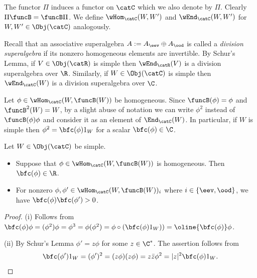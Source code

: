 \documentclass[12pt]{amsart}
\begin{document}
The functor $\Pi$ induces a functor on $\catC$ which  we also denote by $\Pi$.  Clearly $\Pi\funcB=\funcB\Pi$.
 We  define $\wHom_\catC(W,W')$ and $\wEnd_\catC(W,W')$ for $W,W'\in\Obj(\catC)$ analogously. 
 
Recall that an associative superalgebra $A:=A_{\eev}\oplus A_{\ood}$ is called a \emph{division superalgebra} if its nonzero homogeneous  elements are invertible. By Schur's Lemma,  
if $V\in\Obj(\catR)$ is simple then $\wEnd_\catR(V)$ is a division superalgebra over $\R$. Similarly, if $W\in\Obj(\catC)$ is simple then  $\wEnd_\catC(W)$
is a division superalgebra over $\C$.

Let $\phi\in\wHom_\catC(W,\funcB (W))$ be  homogeneous. Since  $\funcB(\phi)=\phi$ and $\funcB^2(W)=W$, by a slight abuse of notation we can write 
$\phi^2$ instead of $\funcB(\phi)\phi$ and consider it  as an element of  $\End_\catC(W)$. In particular, if $W$ is simple then $\phi^2=\bfc(\phi) 1_{W}$ for a scalar $\bfc(\phi)\in\C$. 
\begin{lem}
\label{lem:sig}
Let $W\in\Obj(\catC)$ be simple.
\begin{itemize}
\item[\rm (i)]
Suppose that $\phi\in\wHom_\catC(W,\funcB(W))$ is homogeneous. Then $\bfc(\phi)\in\R$.
\item[\rm(ii)]
For nonzero $\phi,\phi'\in\wHom_\catC(W,\funcB(W))_i$ where $i\in\{\eev,\ood\}$, we have $\bfc(\phi)\bfc(\phi')>0$.  
\end{itemize}
\end{lem}
\begin{proof}
(i) Follows from $
\bfc(\phi)\phi=(\phi^2)\phi=
\phi^3=\phi(\phi^2)=\phi \circ(\bfc(\phi)1_W))=\oline{\bfc(\phi)}\phi$.

(ii) By Schur's Lemma $\phi'=z\phi$ for some $z\in\C^*$. The assertion follows from \[
\bfc(\phi')1_W=(\phi')^2=(z\phi)(z\phi)=z\bar z\phi^2=|z|^2\bfc(\phi)1_W.\qedhere
\] 
\end{proof}
\end{document}
